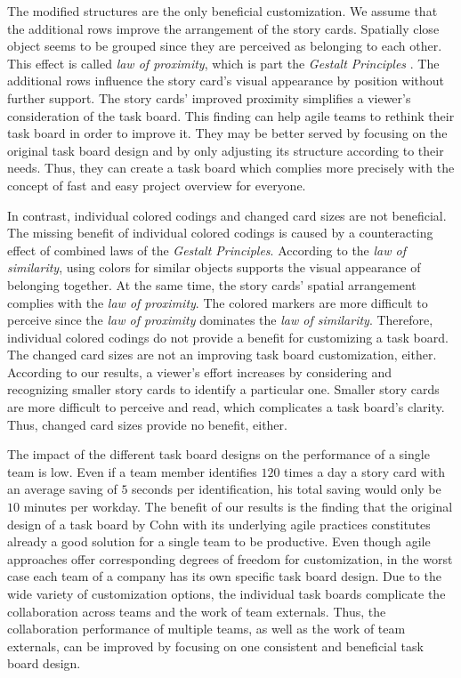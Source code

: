 \documentclass{llncs}
\begin{document}
The modified structures are the only beneficial customization. We assume that 
the additional rows improve the arrangement of the story cards. Spatially close 
object seems to be grouped since they are perceived as belonging to each other. 
This effect is called \textit{law of proximity}, which is part the 
\textit{Gestalt Principles} \cite{Palmer.1999}. 
The additional rows influence the story card's visual appearance by position 
without further support. The story cards' improved proximity simplifies a 
viewer's consideration of the task board. This finding can help agile teams to 
rethink their task board in order to improve it. They may be better served by 
focusing on the original task board design and by only adjusting its structure 
according to their needs. Thus, they can create a task board which complies 
more precisely with the concept of fast and easy project overview for everyone.

In contrast, individual colored codings and changed card sizes are not 
beneficial. The missing benefit of individual colored codings is caused by a 
counteracting effect of combined laws of the \textit{Gestalt Principles}. 
According to the \textit{law of similarity}, using colors for similar objects 
supports the visual appearance of belonging together. At the same time, the 
story cards' spatial arrangement complies with the \textit{law of proximity}. 
The colored markers are more difficult to perceive since the \textit{law of 
proximity} dominates the \textit{law of similarity}. Therefore, individual 
colored codings do not provide a benefit for customizing a task board. The 
changed card sizes are not an improving task board customization, either. 
According to our results, a viewer's effort increases by considering and 
recognizing smaller story cards to identify a particular one. Smaller story 
cards are more difficult to perceive and read, which complicates a task board's 
clarity. Thus, changed card sizes provide no benefit, either.

The impact of the different task board designs on the performance of a 
single team is low. Even if a team member identifies $120$ times a day a story 
card with an average saving of $5$ seconds per identification, his total saving 
would only be $10$ minutes per workday.
The benefit of our results is the finding that the original design of a task 
board by Cohn \cite{Cohn.2012} with its underlying agile practices constitutes 
already a good solution for a single team to be productive. Even though agile 
approaches offer corresponding degrees of freedom for customization, in the 
worst case each team of a company has its own specific task board design. Due 
to the wide variety of customization options, the individual task boards 
complicate the collaboration across teams and the work of team externals. Thus, 
the collaboration performance of multiple teams, as well as the work of team 
externals, can be improved by focusing on one consistent and beneficial task 
board design.
\end{document}
